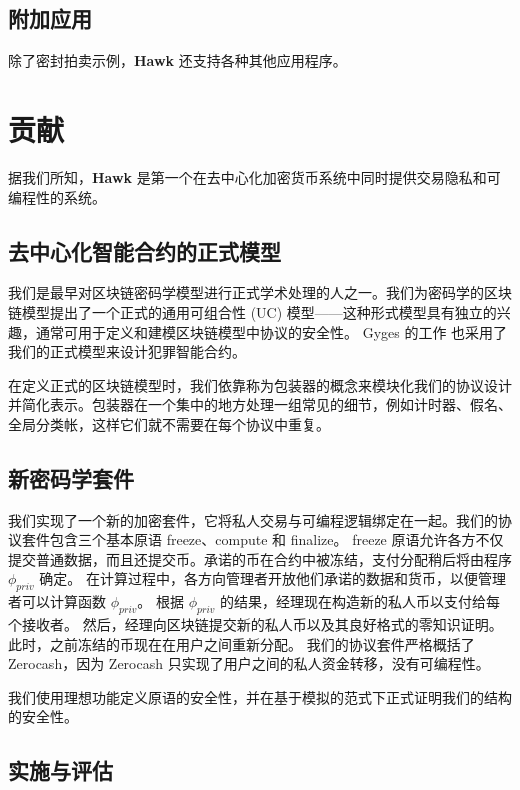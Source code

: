 \documentclass{xduugtrans}
\begin{document}
\subsection{附加应用}

除了密封拍卖示例，\textbf{Hawk} 还支持各种其他应用程序。

\section{贡献}

据我们所知，\textbf{Hawk} 是第一个在去中心化加密货币系统中同时提供交易隐私和可编程性的系统。

\subsection{去中心化智能合约的正式模型}

我们是最早对区块链密码学模型进行正式学术处理的人之一。我们为密码学的区块链模型提出了一个正式的通用可组合性 (UC) 模型——这种形式模型具有独立的兴趣，通常可用于定义和建模区块链模型中协议的安全性。 Gyges 的工作 \cite{ref35} 也采用了我们的正式模型来设计犯罪智能合约。

在定义正式的区块链模型时，我们依靠称为包装器的概念来模块化我们的协议设计并简化表示。包装器在一个集中的地方处理一组常见的细节，例如计时器、假名、全局分类帐，这样它们就不需要在每个协议中重复。

\subsection{新密码学套件}

我们实现了一个新的加密套件，它将私人交易与可编程逻辑绑定在一起。我们的协议套件包含三个基本原语 freeze、compute 和 finalize。 freeze 原语允许各方不仅提交普通数据，而且还提交币。承诺的币在合约中被冻结，支付分配稍后将由程序 $\phi _{priv}$ 确定。 在计算过程中，各方向管理者开放他们承诺的数据和货币，以便管理者可以计算函数 $\phi _{priv}$。 根据 $\phi _{priv}$ 的结果，经理现在构造新的私人币以支付给每个接收者。 然后，经理向区块链提交新的私人币以及其良好格式的零知识证明。 此时，之前冻结的币现在在用户之间重新分配。 我们的协议套件严格概括了 Zerocash，因为 Zerocash 只实现了用户之间的私人资金转移，没有可编程性。

我们使用理想功能定义原语的安全性，并在基于模拟的范式下正式证明我们的结构的安全性。

\subsection{实施与评估}
\end{document}
